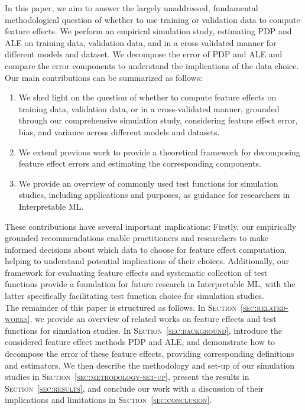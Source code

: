 \documentclass[runningheads]{llncs}
\begin{document}
\noindent In this paper, we aim to answer the largely unaddressed, fundamental
methodological question of whether to use training or validation data to
compute feature effects. We perform an empirical simulation study, estimating
PDP and ALE on training data, validation data, and in a cross-validated manner
for different models and dataset. We decompose the error of PDP and ALE and
compare the error components to understand the implications of the data choice.
Our main contributions can be summarized as follows:

\begin{enumerate}
    \item We shed light on the question of whether to compute feature effects on training
          data, validation data, or in a cross-validated manner, grounded through our
          comprehensive simulation study, considering feature effect error, bias, and
          variance across different models and datasets.
    \item We extend previous work to provide a theoretical framework for decomposing
          feature effect errors and estimating the corresponding components.
    \item We provide an overview of commonly used test functions for simulation studies,
          including applications and purposes, as guidance for researchers in
          Interpretable ML.  %
\end{enumerate}

\noindent These contributions have several important implications: Firstly, our empirically
grounded recommendations enable practitioners and researchers to make informed
decisions about which data to choose for feature effect computation, helping to
understand potential implications of their choices. Additionally, our framework
for evaluating feature effects and systematic collection of test functions
provide a foundation for future research in Interpretable ML, with the latter
specifically facilitating test function choice for simulation studies.\\

\noindent The remainder of this paper is structured as follows. In
\textsc{Section~\ref{sec:related-works}}, we provide an overview of related
works on feature effects and test functions for simulation studies. In
\textsc{Section~\ref{sec:background}}, introduce the considered feature
effect methods PDP and ALE, and demonstrate how to decompose the error of these
feature effects, providing corresponding definitions and estimators.
We then describe the methodology and set-up of our simulation studies in
\textsc{Section~\ref{sec:methodology-set-up}}, present the results in
\textsc{Section~\ref{sec:results}}, and conclude our work with a discussion
of their implications and limitations in \textsc{Section~\ref{sec:conclusion}}.
\end{document}
